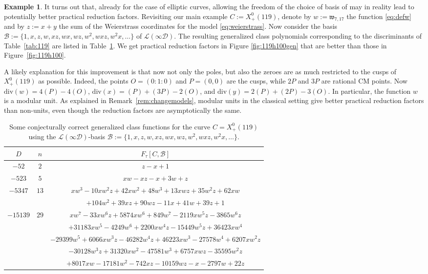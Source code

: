 \documentclass{amsart}
\renewcommand{\div}{\mathrm{div}}
\newcommand{\mc}{\mathcal}
\newcommand{\xplus}[1]{X^0_+(#1)}
\numberwithin{equation}{section}
\theoremstyle{definition}
\newtheorem{example}[equation]{Example}
\begin{document}
\begin{example}\label{example:otherbasis}
It turns out that, already for the case of elliptic curves, allowing the freedom of the choice of basis of may in reality lead to potentially better practical reduction factors.
Revisiting our main example $C:=\xplus{119}$,
denote by $w:=\mathfrak{w}_{7,17}$ the function \eqref{eq:defw} and by $z:=x+y$ the sum of the Weierstrass coordinates for the model \eqref{eq:weierstrass}. Now consider the basis $\mc{B}:=\{1,x,z,w,xz,wx,wz,w^2,wxz,w^2x,\ldots\}$ of $\mc{L}(\infty\mc{D})$. The resulting generalized class polynomials corresponding to the discriminants of Table~\ref{tab:119} are listed in Table~\ref{tab:119gen}.
We get practical reduction factors in Figure \ref{fig:119h100gen} that are better than those in Figure~\ref{fig:119h100}.

A likely explanation for this improvement is that now not only the poles,
but also the zeroes are as much restricted to the cusps of $\xplus{119}$ as possible.
Indeed, the points $O=(0:1:0)$ and $P=(0,0)$ are the cusps, while
$2P$ and $3P$ are rational CM points.
Now $\div(w) = 4(P)-4(O)$,
$\div(x) = (P) + (3P) - 2(O)$,
and $\div(y) = 2(P) + (2P) -3(O)$.
In particular, the function $w$ is a modular unit.
As explained in Remark~\ref{rem:changemodels}, modular units in the classical setting
give better practical reduction factors than non-units, even though the reduction factors are asymptotically the same.
\end{example}

\begin{table}[htbp]
\setlength{\tabcolsep}{3pt}
\renewcommand{\arraystretch}{1.2}
\begin{tabular}{c|c|c}
 $D$  & $n$ & $F_{\tau}[C,\mc{B}]$ \\ \hline
 $-52$ & $2$ & $z-x+1$ \\ \hline
 $-523$ & $5$ & $xw - xz - x + 3w + z$\\ \hline
 \multirow{2}{*}{$-5347$} & \multirow{2}{*}{$13$} & $xw^3 - 10xw^2z + 42xw^2 + 48w^3 + 13xwz + 35w^2z + 62xw $\\
 & &  $ + 104w^2 + 39xz + 90wz - 11x + 41w + 39z + 1$ \\ \hline
 \multirow{5}{*}{$-15139$} & \multirow{5}{*}{$29$} & $xw^7 - 33xw^6z + 5874xw^6 + 849w^7 - 2119xw^5z - 3865w^6z $\\
 & & $+ 31183xw^5 - 4249w^6 + 2200xw^4z - 15449w^5z + 36423xw^4$\\
 & & ${-}29399w^5{+}6066xw^3z{-}46282w^4z{+}46223xw^3{-}27578w^4{+}6207xw^2z$\\
 & &   $ - 30128w^3z + 31320xw^2 - 47581w^3 + 6757xwz - 35595w^2z$\\
 & & $ + 8017xw - 17181w^2 - 742xz - 10159wz - x - 2797w + 22z$\\ \hline
\end{tabular}
\\[2mm]
\caption{Some conjecturally correct generalized class functions for the curve $C=\xplus{119}$ using the $\mc{L}(\infty\mc{D})$-basis $\mc{B}:=\{1,x,z,w,xz,wx,wz,w^2,wxz,w^2x,\ldots\}$.}
\label{tab:119gen}
\end{table}
\end{document}
